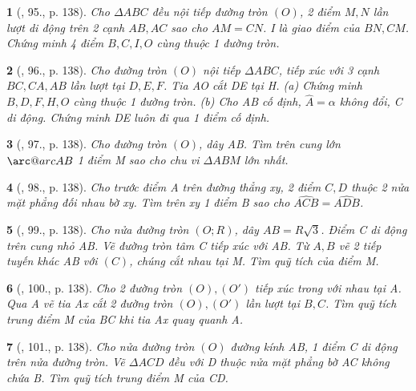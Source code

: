 \documentclass{article}
\makeatletter
\newcommand{\arc@char}{{\usefont{U}{tipa}{m}{n}\symbol{62}}}%
\newcommand{\arc}[1]{\mathpalette\arc@arc{#1}}
\newcommand{\arc@arc}[2]{%
	\sbox0{$\m@th#1#2$}%
	\vbox{
		\hbox{\resizebox{\wd0}{\height}{\arc@char}}
		\nointerlineskip
		\box0
	}%
}
\newtheorem{baitoan}{}
\makeatother
\begin{document}
\begin{baitoan}[\cite{Tuyen_Toan_9_old}, 95., p. 138]
	Cho $\Delta ABC$ đều nội tiếp đường tròn $(O)$, 2 điểm $M,N$ lần lượt di động trên 2 cạnh $AB,AC$ sao cho $AM = CN$. I là giao điểm của $BN,CM$. Chứng minh 4 điểm $B,C,I,O$ cùng thuộc 1 đường tròn.
\end{baitoan}

\begin{baitoan}[\cite{Tuyen_Toan_9_old}, 96., p. 138]
	Cho đường tròn $(O)$ nội tiếp $\Delta ABC$, tiếp xúc với 3 cạnh $BC,CA,AB$ lần lượt tại $D,E,F$. Tia AO cắt DE tại H. (a) Chứng minh $B,D,F,H,O$ cùng thuộc 1 đường tròn. (b) Cho AB cố định, $\widehat{A} = \alpha$ không đổi, C di động. Chứng minh DE luôn đi qua 1 điểm cố định.
\end{baitoan}

\begin{baitoan}[\cite{Tuyen_Toan_9_old}, 97., p. 138]
	Cho đường tròn $(O)$, dây AB. Tìm trên cung lớn $\arc{AB}$ 1 điểm M sao cho chu vi $\Delta ABM$ lớn nhất.
\end{baitoan}

\begin{baitoan}[\cite{Tuyen_Toan_9_old}, 98., p. 138]
	Cho trước điểm A trên đường thẳng xy, 2 điểm $C,D$ thuộc 2 nửa mặt phẳng đối nhau bờ xy. Tìm trên xy 1 điểm B sao cho $\widehat{ACB} = \widehat{ADB}$.
\end{baitoan}

\begin{baitoan}[\cite{Tuyen_Toan_9_old}, 99., p. 138]
	Cho nửa đường tròn $(O;R)$, dây $AB = R\sqrt{3}$. Điểm C di động trên cung nhỏ AB. Vẽ đường tròn tâm C tiếp xúc với AB. Từ $A,B$ vẽ 2 tiếp tuyến khác AB với $(C)$, chúng cắt nhau tại M. Tìm quỹ tích của điểm M.
\end{baitoan}

\begin{baitoan}[\cite{Tuyen_Toan_9_old}, 100., p. 138]
	Cho 2 đường tròn $(O),(O')$ tiếp xúc trong với nhau tại A. Qua A vẽ tia Ax cắt 2 đường tròn $(O),(O')$ lần lượt tại $B,C$. Tìm quỹ tích trung điểm M của BC khi tia Ax quay quanh A.
\end{baitoan}

\begin{baitoan}[\cite{Tuyen_Toan_9_old}, 101., p. 138]
	Cho nửa đường tròn $(O)$ đường kính AB, 1 điểm C di động trên nửa đường tròn. Vẽ $\Delta ACD$ đều với D thuộc nửa mặt phẳng bờ AC không chứa B. Tìm quỹ tích trung điểm M của CD.
\end{baitoan}
\end{document}
